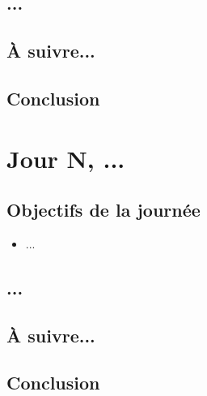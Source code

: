 \documentclass[a4paper,11pt]{article}
\begin{document}
\subsection{...}
\subsection{À suivre...}
\subsection{Conclusion}
\newpage


\section{Jour N, ...}
\subsection{Objectifs de la journée}
\begin{itemize}
    \item ...
\end{itemize}
\subsection{...}
\subsection{À suivre...}
\subsection{Conclusion}
\newpage


\end{document}
